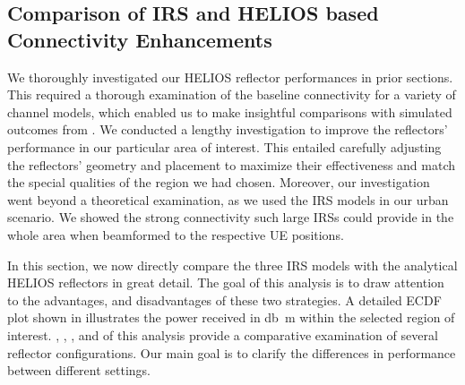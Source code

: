 \subsection{Comparison of IRS and HELIOS based Connectivity Enhancements}\label{Comparing Passive Analytical Model to Active IRS Models}
We thoroughly investigated our HELIOS reflector performances in prior sections. This required a thorough examination of the baseline connectivity for a variety of channel models, which enabled us to make insightful comparisons with simulated outcomes from \cite{Helios}. We conducted a lengthy investigation to improve the reflectors' performance in our particular area of interest. This entailed carefully adjusting the reflectors' geometry and placement to maximize their effectiveness and match the special qualities of the region we had chosen. Moreover, our investigation went beyond a theoretical examination, as we used the IRS models in our urban scenario. We showed the strong connectivity such large IRSs could provide in the whole area when beamformed to the respective UE positions.

In this section, we now directly compare the three IRS models with the analytical HELIOS reflectors in great detail. The goal of this analysis is to draw attention to the advantages, and disadvantages of these two strategies. A detailed ECDF plot shown in  illustrates the power received in \si{\decibel\meter} within the selected region of interest. , , , and  of this analysis provide a comparative examination of several reflector configurations. Our main goal is to clarify the differences in performance between different settings.

